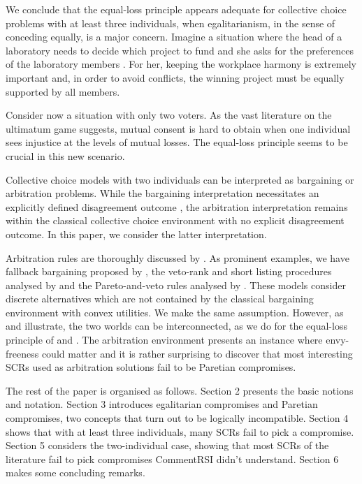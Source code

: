 \documentclass[version=3.21, pagesize, twoside=off, bibliography=totoc, DIV=calc, fontsize=12pt, a4paper]{scrartcl}
\begin{document}
We conclude that the equal-loss principle appears adequate for collective choice problems with at least three individuals, when egalitarianism, in the sense of conceding equally, is a major concern. Imagine a situation where the head of a laboratory needs to decide which project to fund and she asks for the preferences of the laboratory members .  For her, keeping the workplace harmony is extremely important and, in order to avoid conflicts, the winning project must be equally supported by all members. 

Consider now a situation with only two voters. As the vast literature on the ultimatum game \citep{Werner2014} suggests, mutual consent is hard to obtain when one individual sees injustice at the levels of mutual losses. The equal-loss principle seems to be crucial in this new scenario.

Collective choice models with two individuals can be interpreted as bargaining or arbitration problems. While the bargaining interpretation necessitates an explicitly defined disagreement outcome \citep{Kibris2007}, the arbitration interpretation \citep{Sprumont1993} remains within the classical collective choice environment with no explicit disagreement outcome. In this paper, we consider the latter interpretation. 

Arbitration rules are thoroughly discussed by \citet{Barbera2020}. As prominent examples, we have fallback bargaining   proposed by \citet{Brams2001}, the veto-rank and short listing procedures analysed by \citet{Clippel2014} and the Pareto-and-veto rules analysed by \citet{Laslier2020}. These models consider discrete alternatives which are not contained by the classical \citet{Nash1950} bargaining environment with convex utilities. We make the same assumption. However, as \citet{Mariotti1998} and \citet{Nagahisa2002} illustrate, the two worlds can be interconnected, as we do for the equal-loss principle of \citet{Chun1988} and \citet{Chun1991}. The arbitration environment presents an instance where envy-freeness could matter and it is rather surprising to discover that most interesting \acp{SCR} used as arbitration solutions fail to be Paretian compromises.

The rest of the paper is organised as follows. Section 2 presents the basic notions and notation. Section 3 introduces egalitarian compromises and Paretian compromises, two concepts that turn out to be logically incompatible. Section 4 shows that with at least three individuals, many \acp{SCR} fail to pick a compromise. Section 5 considers the two-individual case, showing that most \acp{SCR} of the literature fail to pick compromises  CommentRS{I didn't understand}. Section 6 makes some concluding remarks. 
\end{document}
